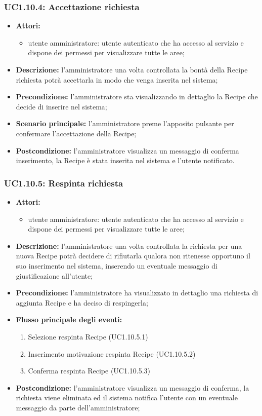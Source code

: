 \subsubsection{UC1.10.4: Accettazione richiesta}
	\begin{itemize}
		\item \textbf{Attori:}
		\begin{itemize}
			\item utente amministratore: utente autenticato che ha accesso al servizio e dispone dei permessi per visualizzare tutte le aree;
		\end{itemize}
		\item \textbf{Descrizione:} l'amministratore una volta controllata la bontà della Recipe richiesta potrà accettarla in modo che venga inserita nel sistema;
		\item \textbf{Precondizione:} l'amministratore sta visualizzando in dettaglio la Recipe che decide di inserire nel sistema;
		\item \textbf{Scenario principale:} l'amministratore preme l'apposito pulsante per confermare l'accettazione della Recipe;
		\item \textbf{Postcondizione:} l'amministratore visualizza un messaggio di conferma inserimento, la Recipe è stata inserita nel sistema e l'utente notificato.
	\end{itemize}

\subsubsection{UC1.10.5: Respinta richiesta}
	\begin{itemize}
		\item \textbf{Attori:}
		\begin{itemize}
			\item utente amministratore: utente autenticato che ha accesso al servizio e dispone dei permessi per visualizzare tutte le aree;
		\end{itemize}
		\item \textbf{Descrizione:} l'amministratore una volta controllata la richiesta per una nuova Recipe potrà decidere di rifiutarla qualora non ritenesse opportuno il suo inserimento nel sistema, inserendo un eventuale messaggio di giustificazione all'utente;
		\item \textbf{Precondizione:} l'amministratore ha visualizzato in dettaglio una richiesta di aggiunta Recipe e ha deciso di respingerla;
		\item \textbf{Flusso principale degli eventi:}
		\begin{enumerate}
			\item Selezione respinta Recipe (UC1.10.5.1)
			\item Inserimento motivazione respinta Recipe (UC1.10.5.2)
			\item Conferma respinta Recipe (UC1.10.5.3)
		\end{enumerate}
		\item \textbf{Postcondizione:} l'amministratore visualizza un messaggio di conferma, la richiesta viene eliminata ed il sistema notifica l'utente con un eventuale messaggio da parte dell'amministratore;
	\end{itemize}

